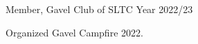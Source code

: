 \begin{cventries}
  \cventry
    {Member, Gavel Club of SLTC} %
    {} %
    {} %
    {Year 2022/23} %
    {
      \begin{cvitems} %
        \item {Organized Gavel Campfire 2022.}
      \end{cvitems}
    }

\end{cventries}
